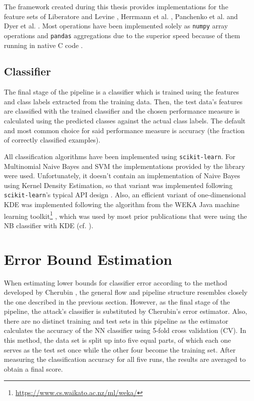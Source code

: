 \documentclass[
	ruledheaders=chapter,
	class=report,
	thesis={type=master, department=inf},
	accentcolor=1c,
	custommargins=true,
	marginpar=false,
	parskip=half-,
	fontsize=11pt,
]{tudapub}
\begin{document}
	The framework created during this thesis provides implementations for the feature sets of Liberatore and Levine \cite{Liberatore2006}, Herrmann et al. \cite{Herrmann2009}, Panchenko et al. \cite{Panchenko2011, Panchenko2016} and Dyer et al. \cite{Dyer2012}. Most operations have been implemented solely as \texttt{numpy} array operations and \texttt{pandas} aggregations due to the superior speed because of them running in native C code \cite{Harris2020,McKinney2010}.
	
	\subsection{Classifier}
	
	The final stage of the pipeline is a classifier which is trained using the features and class labels extracted from the training data. Then, the test data's features are classified with the trained classifier and the chosen performance measure is calculated using the predicted classes against the actual class labels. The default and most common choice for said performance measure is accuracy (the fraction of correctly classified examples).
	
	All classification algorithms have been implemented using \texttt{scikit-learn}. For Multinomial Naive Bayes and SVM the implementations provided by the library were used. Unfortunately, it doesn't contain an implementation of Naive Bayes using Kernel Density Estimation, so that variant was implemented following \texttt{scikit-learn}'s typical API design \cite{Buitinck2013}. Also, an efficient variant of one-dimensional KDE was implemented following the algorithm from the WEKA Java machine learning toolkit\footnote{\url{https://www.cs.waikato.ac.nz/ml/weka/}} \cite{Frank2016}, which was used by most prior publications that were using the NB classifier with KDE (cf. \cite{Liberatore2006,Dyer2012}).

	\section{Error Bound Estimation}
	\label{error_bound_estimation}

	When estimating lower bounds for classifier error according to the method developed by Cherubin \cite{Cherubin2017}, the general flow and pipeline structure resembles closely the one described in the previous section. However, as the final stage of the pipeline, the attack's classifier is substituted by Cherubin's error estimator. Also, there are no distinct training and test sets in this pipeline as the estimator calculates the accuracy of the NN classifier using 5-fold cross validation (CV). In this method, the data set is split up into five equal parts, of which each one serves as the test set once while the other four become the training set. After measuring the classification accuracy for all five runs, the results are averaged to obtain a final score.
	
\end{document}
